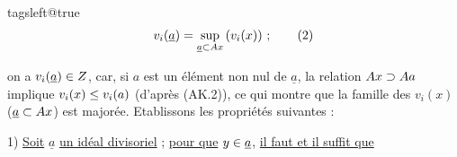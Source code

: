 \begingroup\csname tagsleft@true\endcsname
\[ v_i(\underline a)=\sup_{\underline a\handwritten{\subset}Ax}\,(v_i(x))\ ;\tag*{(2)} \]
\endgroup

on a $v_i(\underline a)\in Z$, car, si $a$ est un élément non nul de $\underline a$, la relation $Ax\supset Aa$ implique $v_i(x)\leq v_i(a)$ (d'après (AK.2)), ce qui montre que la famille des $v_i(x)$ ($\underline a\subset Ax$) est majorée. Etablissons les propriétés suivantes :

1) \uline{Soit} $\underline a$ \uline{un idéal divisoriel} ; \uline{pour que} $y\in\underline a$, \uline{il faut et il suffit que}

